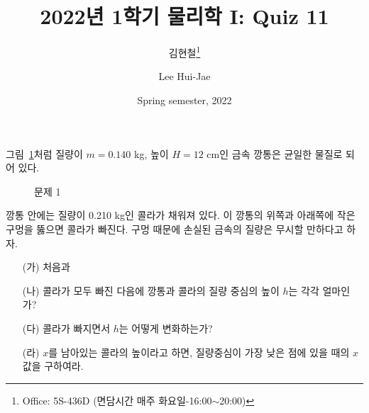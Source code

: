 \documentclass[floatfix,nofootinbib,superscriptaddress,fleqn]{revtex4-2}
\begin{document}
\title{\Large 2022년 1학기 물리학 I: Quiz 11}
\author{김현철\footnote{Office: 5S-436D (면담시간 매주
    화요일-16:00$\sim$20:00)}} 
\author{Lee Hui-Jae} 
\date{Spring semester, 2022}



\maketitle


그림~\ref{fig:1}처럼 질량이 $m=0.140$ 
kg, 높이 $H=12$ cm인 금속 깡통은 균일한 물질로 되어 있다. 
\begin{figure}[htp]
  \centering
  \caption{문제 1}
  \label{fig:1}
\end{figure}
깡통 안에는 질량이 0.210 kg인 콜라가 채워져 있다. 이 깡통의 위쪽과
아래쪽에 작은 구멍을 뚫으면 콜라가 빠진다. 구멍 때문에 손실된 금속의
질량은 무시할 만하다고 하자.
\begin{itemize}
\item[(가)] 처음과
\item[(나)] 콜라가 모두 빠진 다음에 깡통과 콜라의 질량 중심의 높이
  $h$는 각각 얼마인가?
\item[(다)] 콜라가 빠지면서 $h$는 어떻게 변화하는가?
\item[(라)] $x$를 남아있는 콜라의 높이라고 하면, 질량중심이 가장 낮은
  점에 있을 때의 $x$ 값을 구하여라. 
\end{itemize}
\end{document}
